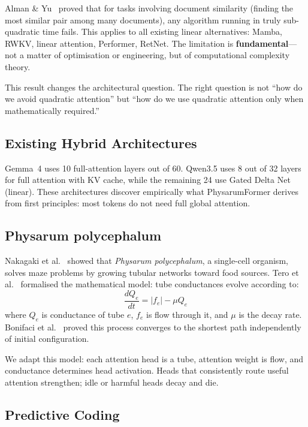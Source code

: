 \documentclass[11pt]{article}
\begin{document}
Alman \& Yu~\cite{alman2025limitations} proved that for tasks involving document similarity (finding the most similar pair among many documents), any algorithm running in truly sub-quadratic time fails. This applies to all existing linear alternatives: Mamba, RWKV, linear attention, Performer, RetNet. The limitation is \textbf{fundamental}---not a matter of optimisation or engineering, but of computational complexity theory.

This result changes the architectural question. The right question is not ``how do we avoid quadratic attention'' but ``how do we use quadratic attention only when mathematically required.''

\subsection{Existing Hybrid Architectures}

Gemma~4 \cite{gemma4} uses 10 full-attention layers out of 60. Qwen3.5 uses 8 out of 32 layers for full attention with KV cache, while the remaining 24 use Gated Delta Net (linear). These architectures discover empirically what PhysarumFormer derives from first principles: most tokens do not need full global attention.

\subsection{Physarum polycephalum}

Nakagaki et al.~\cite{nakagaki2000} showed that \textit{Physarum polycephalum}, a single-cell organism, solves maze problems by growing tubular networks toward food sources. Tero et al.~\cite{tero2010} formalised the mathematical model: tube conductances evolve according to:
\begin{equation}
  \frac{dQ_e}{dt} = |f_e| - \mu Q_e
  \label{eq:physarum}
\end{equation}
where $Q_e$ is conductance of tube $e$, $f_e$ is flow through it, and $\mu$ is the decay rate. Bonifaci et al.~\cite{bonifaci2012} proved this process converges to the shortest path independently of initial configuration.

We adapt this model: each attention head is a tube, attention weight is flow, and conductance determines head activation. Heads that consistently route useful attention strengthen; idle or harmful heads decay and die.

\subsection{Predictive Coding}
\end{document}
